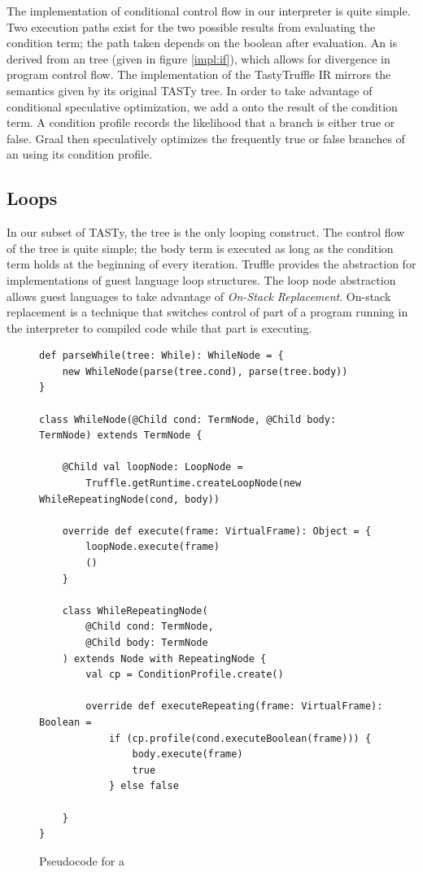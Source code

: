 The implementation of conditional control flow in our interpreter is quite simple.
Two execution paths exist for the two possible results from evaluating the condition term; the path taken depends on the boolean after evaluation.
An  is derived from an  tree (given in figure \ref{impl:if}), which allows for divergence in program control flow.
The implementation of the TastyTruffle IR mirrors the semantics given by its original TASTy tree.
In order to take advantage of conditional speculative optimization, we add a  onto the result of the condition term.
A condition profile records the likelihood that a branch is either true or false.
Graal then speculatively optimizes the frequently true or false branches of an  using its condition profile.

\subsection{Loops}

In our subset of TASTy, the  tree is the only looping construct.
The control flow of the  tree is quite simple; the body term is executed as long as the condition term holds at the beginning of every iteration.
Truffle provides the  abstraction for implementations of guest language loop structures.
The loop node abstraction allows guest languages to take advantage of \textit{On-Stack Replacement}\cite{osr}.
On-stack replacement is a technique that switches control of part of a program running in the interpreter to compiled code while that part is executing.

\begin{figure}[!htb]
\begin{verbatim}
def parseWhile(tree: While): WhileNode = {
	new WhileNode(parse(tree.cond), parse(tree.body))	
}
	
class WhileNode(@Child cond: TermNode, @Child body: TermNode) extends TermNode {
	
	@Child val loopNode: LoopNode = 
		Truffle.getRuntime.createLoopNode(new WhileRepeatingNode(cond, body))
	
	override def execute(frame: VirtualFrame): Object = {
		loopNode.execute(frame)
		()
	}
	
	class WhileRepeatingNode(
		@Child cond: TermNode, 
		@Child body: TermNode
	) extends Node with RepeatingNode {
		val cp = ConditionProfile.create()
		
		override def executeRepeating(frame: VirtualFrame): Boolean = 
			if (cp.profile(cond.executeBoolean(frame))) {
				body.execute(frame)
				true 
			} else false 
			
	}
}
\end{verbatim}
\caption{Pseudocode for a }
\label{impl:while}
\end{figure}

